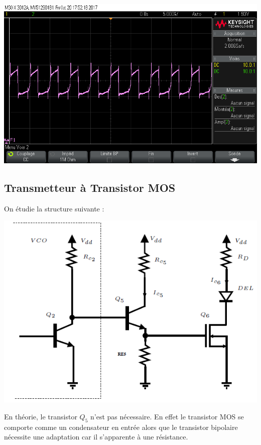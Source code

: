 \documentclass[a4paper]{report}
\begin{document}
\begin{center}
\includegraphics[width=1\textwidth]{Courant_diode_opt.png}
\end{center}



\subsection{Transmetteur à Transistor MOS}
On étudie la structure suivante : \\
\begin{center}
\includegraphics[width=.5\textwidth]{transimos.PNG}
\end{center}

En théorie, le transistor $Q_5$ n'est pas nécessaire. En effet le transistor MOS se comporte comme un condensateur en entrée alors que le transistor bipolaire nécessite une adaptation car il s'apparente à une résistance.\\
\end{document}
